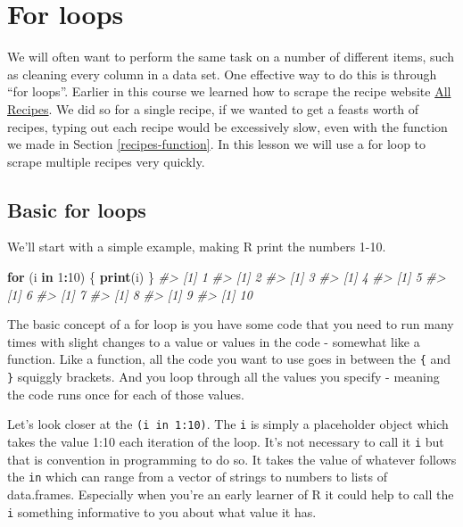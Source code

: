 \documentclass[
  12pt,
]{book}
\newenvironment{Shaded}{\begin{snugshade}}{\end{snugshade}}
\newcommand{\CommentTok}[1]{\textcolor[rgb]{0.37,0.37,0.37}{\textit{#1}}}
\newcommand{\ControlFlowTok}[1]{\textcolor[rgb]{0.27,0.27,0.27}{\textbf{#1}}}
\newcommand{\DecValTok}[1]{\textcolor[rgb]{0.06,0.06,0.06}{#1}}
\newcommand{\KeywordTok}[1]{\textcolor[rgb]{0.27,0.27,0.27}{\textbf{#1}}}
\newcommand{\NormalTok}[1]{#1}
\newcommand{\OperatorTok}[1]{\textcolor[rgb]{0.43,0.43,0.43}{\textbf{#1}}}
\begin{document}
\hypertarget{for-loops}{%
\chapter{For loops}\label{for-loops}}

We will often want to perform the same task on a number of different items, such as cleaning every column in a data set. One effective way to do this is through ``for loops''. Earlier in this course we learned how to scrape the recipe website \href{https://www.allrecipes.com/}{All Recipes}. We did so for a single recipe, if we wanted to get a feasts worth of recipes, typing out each recipe would be excessively slow, even with the function we made in Section \ref{recipes-function}. In this lesson we will use a for loop to scrape multiple recipes very quickly.

\hypertarget{basic-for-loops}{%
\section{Basic for loops}\label{basic-for-loops}}

We'll start with a simple example, making R print the numbers 1-10.

\begin{Shaded}
\begin{Highlighting}[]
\ControlFlowTok{for}\NormalTok{ (i }\ControlFlowTok{in} \DecValTok{1}\OperatorTok{:}\DecValTok{10}\NormalTok{) \{}
   \KeywordTok{print}\NormalTok{(i)}
\NormalTok{\}}
\CommentTok{\#> [1] 1}
\CommentTok{\#> [1] 2}
\CommentTok{\#> [1] 3}
\CommentTok{\#> [1] 4}
\CommentTok{\#> [1] 5}
\CommentTok{\#> [1] 6}
\CommentTok{\#> [1] 7}
\CommentTok{\#> [1] 8}
\CommentTok{\#> [1] 9}
\CommentTok{\#> [1] 10}
\end{Highlighting}
\end{Shaded}

The basic concept of a for loop is you have some code that you need to run many times with slight changes to a value or values in the code - somewhat like a function. Like a function, all the code you want to use goes in between the \texttt{\{} and \texttt{\}} squiggly brackets. And you loop through all the values you specify - meaning the code runs once for each of those values.

Let's look closer at the \texttt{(i\ in\ 1:10)}. The \texttt{i} is simply a placeholder object which takes the value 1:10 each iteration of the loop. It's not necessary to call it \texttt{i} but that is convention in programming to do so. It takes the value of whatever follows the \texttt{in} which can range from a vector of strings to numbers to lists of data.frames. Especially when you're an early learner of R it could help to call the \texttt{i} something informative to you about what value it has.
\end{document}
